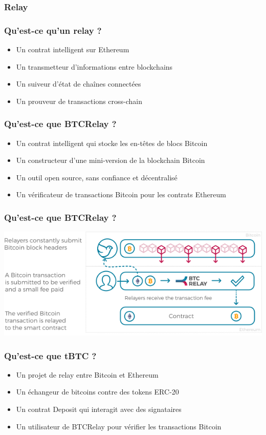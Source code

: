 \begin{frame}
  \frametitle{Relay}
  
\end{frame}

\begin{frame} 
  \frametitle{Qu’est-ce qu’un relay ?} 
  \begin{itemize} 
    \item Un contrat intelligent sur Ethereum 
    \item Un transmetteur d’informations entre blockchains 
    \item Un suiveur d’état de chaînes connectées 
    \item Un prouveur de transactions cross-chain 
  \end{itemize} 
\end{frame}

\begin{frame} 
  \frametitle{Qu’est-ce que BTCRelay ?} 
  \begin{itemize} 
    \item Un contrat intelligent qui stocke les en-têtes de blocs Bitcoin 
    \item Un constructeur d’une mini-version de la blockchain Bitcoin 
    \item Un outil open source, sans confiance et décentralisé 
    \item Un vérificateur de transactions Bitcoin pour les contrats Ethereum 
  \end{itemize} 
\end{frame}

\begin{frame}
  \frametitle{Qu’est-ce que BTCRelay ?}
  \centering
  \includegraphics[scale = 0.5]{decentralisation/btcRelay.png}
\end{frame}

\begin{frame} 
  \frametitle{Qu’est-ce que tBTC ?} 
  \begin{itemize} 
    \item Un projet de relay entre Bitcoin et Ethereum 
    \item Un échangeur de bitcoins contre des tokens ERC-20 
    \item Un contrat Deposit qui interagit avec des signataires 
    \item Un utilisateur de BTCRelay pour vérifier les transactions Bitcoin 
  \end{itemize}
\end{frame}